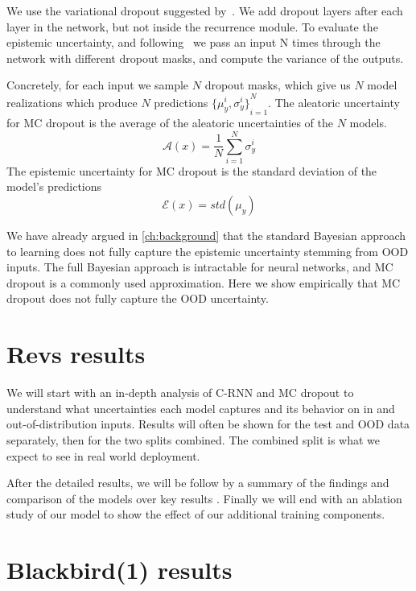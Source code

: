 \documentclass[../main.tex]{subfiles}
\begin{document}
We use the variational dropout suggested by~\cite{gal2016theoretically}. We add dropout layers after each layer in the network, but not inside the recurrence module. To evaluate the epistemic uncertainty, and following~\cite{gal2016dropout} we pass an input N times through the network with different dropout masks, and compute the variance of the outputs.

Concretely, for each input we sample $N$ dropout masks, which give us $N$ model realizations which produce $N$ predictions ${\{\mu_y^i, \sigma_y^i\}}_{i=1}^N$. The aleatoric uncertainty for MC dropout is the average of the aleatoric uncertainties of the $N$ models.
$$
 \mathcal{A}(x) = \frac{1}{N} \sum_{i=1}^N \sigma_y^i
$$
The epistemic uncertainty for MC dropout is the standard deviation of the model's predictions
$$
    \mathcal{E}(x) = std(\mu_y)
$$

We have already argued in \cref{ch:background} that the standard Bayesian approach to learning does not fully capture the epistemic uncertainty stemming from OOD inputs. The full Bayesian approach is intractable for neural networks, and MC dropout is a commonly used approximation. Here we show empirically that MC dropout does not fully capture the OOD uncertainty. 

\clearpage
\section{Revs results}
\label{sec:revs_results}

We will start with an in-depth analysis of C-RNN and MC dropout to understand what uncertainties each model captures and its behavior on in and out-of-distribution inputs. Results will often be shown for the test and OOD data separately, then for the two splits combined. The combined split is what we expect to see in real world deployment. 

After the detailed results, we will be follow by a summary of the findings and comparison of the models over key results . Finally we will end with an ablation study of our model to show the effect of our additional training components. 



\clearpage
\section{Blackbird(1) results}

\end{document}
